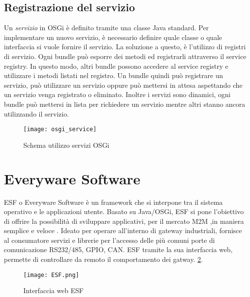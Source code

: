 \subsection{Registrazione del servizio}
Un \emph{servizio} in OSGi è definito tramite una classe Java standard. Per
implementare un nuovo servizio, è necessario definire quale classe o quale
interfaccia si vuole fornire il servizio.
La soluzione a questo, è l'utilizzo di registri di servizio. Ogni bundle può
esporre dei metodi ed registrarli attraverso il service registry. In questo
modo, altri bundle possono accedere al service registry e utilizzare i metodi
listati nel registro. Un bundle quindi può registrare un servizio, può
utilizzare un servizio oppure può mettersi in attesa aspettando che un servizio
venga registrato o eliminato.
Inoltre i servizi sono dinamici, ogni bundle può mettersi in lista per
richiedere un servizio mentre altri stanno ancora utilizzando il servizio.
\begin{figure}[th]
        \centering 
                \texttt{[image: osgi\_service]}
        \caption{Schema utilizzo servizi OSGi}
        \label{}
\end{figure}

\section{Everyware Software}
ESF o Everyware Software è un framework che si interpone tra il sistema operativo
e le applicazioni utente. Basato su Java/OSGi, ESF si pone l'obiettivo di
offrire  la possibilità di sviluppare applicativi, per il mercato M2M ,in maniera semplice e veloce
. Ideato per operare all'interno di gateway
industriali, fornisce al consumatore servizi e librerie per l'accesso delle più
comuni porte di comunicazione RS232/485, GPIO, CAN.
ESF tramite la sua interfaccia web, permette di controllare da remoto il
comportamento dei gatway.
\ref{fig:ESF_web}.


\begin{figure}[th]
        \centering 
                \texttt{[image: ESF.png]}
                \caption{Interfaccia web ESF}
        \label{fig:ESF_web}
\end{figure}

\pagebreak


